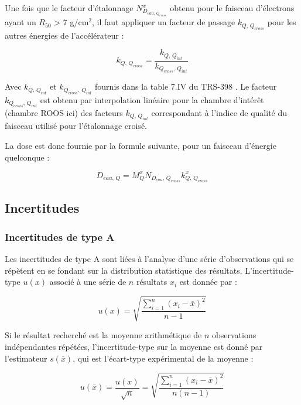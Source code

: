 \documentclass{article}
\begin{document}
Une fois que le facteur d'étalonnage $N_{D_{eau, \, Q_{cross}}}^x$ obtenu pour le faisceau d'électrons ayant un $R_{50}$ > 7 g/cm$^2$, il faut appliquer un facteur de passage $k_{Q,\, Q_{cross}}$ pour les autres énergies de l'accélérateur :

\begin{equation}
  k_{Q,\, Q_{cross}} = \dfrac{k_{Q,\, Q_{int}}}{k_{Q_{cross},\, Q_{int}}}
\end{equation}

Avec $k_{Q,\, Q_{int}}$ et $k_{Q_{cross},\, Q_{int}}$ fournis dans la table 7.IV du TRS-398 \cite{international2001iaea}. Le facteur $k_{Q_{cross},\, Q_{int}}$ est obtenu par interpolation linéaire pour la chambre d'intérêt (chambre ROOS ici) des facteurs $k_{Q,\, Q_{int}}$ correspondant à l'indice de qualité du faisceau utilisé pour l'étalonnage croisé.

La dose est donc fournie par la formule suivante, pour un faisceau d'énergie quelconque :

\begin{equation}
  D_{eau,\, Q} = M_Q^x N_{D_{eau},\, Q_{cross}} k_{Q,\, Q_{cross}}^x
\end{equation}

\subsection{Incertitudes}

\subsubsection{Incertitudes de type A}

Les incertitudes de type A sont liées à l'analyse d'une série d'observations qui se répètent en se fondant sur la distribution statistique des résultats. L'incertitude-type $u(x)$ associé à une série de $n$ résultats $x_i$ est donnée par :

\begin{equation}
  u(x) = \sqrt{\dfrac{\sum\limits_{i=1}^n (x_i - \overline{x})^2}{n-1}}
\end{equation}

Si le résultat recherché est la moyenne arithmétique de $n$ observations indépendantes répétées, l'incertitude-type sur la moyenne est donné par l'estimateur $s(\overline{x})$, qui est l'écart-type expérimental de la moyenne :

\begin{equation}
  u(\overline{x}) = \dfrac{u(x)}{\sqrt{n}} = \sqrt{\dfrac{\sum\limits_{i=1}^n (x_i - \overline{x})^2}{n(n-1)}}
\end{equation}
\end{document}
